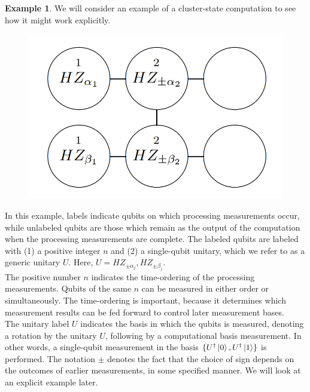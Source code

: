 \documentclass{book}
\theoremstyle{definition}
\newtheorem{exmp}{Example}[section]
\newcommand{\al}{\alpha}
\newcommand{\be}{\beta}
\begin{document}
\begin{exmp}
	We will consider an example of a cluster-state computation to see how it might work explicitly.  
	\begin{figure}[!htb]
		\centering
		\includegraphics[scale=0.3]{cluster2}
	\end{figure}
	In this example, labels indicate qubits on which processing measurements occur, while unlabeled qubits are those which remain as the output of the computation when the processing measurements are complete. The labeled qubits are labeled with (1) a positive integer $n$ and (2) a single-qubit unitary, which we refer to as a generic unitary $U$. Here, $U = HZ_{\pm \al_{j}}, HZ_{\pm \be_j}$. \\
	
	The positive number $n$ indicates the time-ordering of the processing measurements. Qubits of the same $n$ can be measured in either order or simultaneously. The time-ordering is important, because it determines which measurement results can be fed forward to control later measurement bases. \\
	
	The unitary label $U$ indicates the basis in which the qubits is measured, denoting a rotation by the unitary $U$, following by a computational basis measurement.  In other words, a single-qubit measurement in the basis $\{  U^\dagger \ket{0} , U^\dagger\ket{1} \} $ is performed. The notation $\pm$ denotes the fact that the choice of sign depends on the outcomes of earlier measurements, in some specified manner. We will look at an explicit example later. 
\end{exmp}
\end{document}
